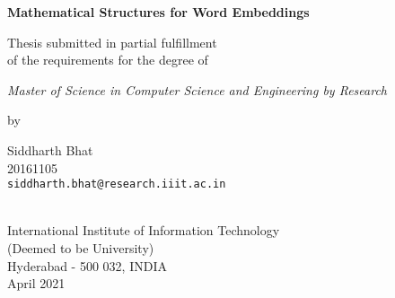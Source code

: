 \thispagestyle{empty}
\begin{center}
\vspace*{1.5cm}
{\Large \bf Mathematical Structures for Word Embeddings}

\vspace*{3.75cm}
{\large Thesis submitted in partial fulfillment\\}
{\large  of the requirements for the degree of \\}

\vspace*{1cm}
{\it {\large Master of Science in Computer Science and Engineering by Research} \\
}

\vspace*{1cm}
{\large by}

\vspace*{5mm}
{\large Siddharth Bhat\\}
{\large 20161105 \\
{\small \tt siddharth.bhat@research.iiit.ac.in }}


\vspace*{4.0cm}
{\\}
{\large International Institute of Information Technology\\}
{\large (Deemed to be University) \\}
{\large Hyderabad - 500 032, INDIA\\}
{\large April 2021 \\}
\end{center}
